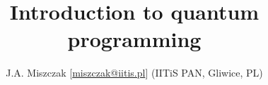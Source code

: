 \documentclass{beamer}
\title{Introduction to quantum programming}
\author{J.A. Miszczak [\url{miszczak@iitis.pl}] (IITiS PAN, Gliwice, PL)}
\begin{document}
    
    
    
\begin{frame}{}
    
\end{frame}

\begin{frame}{}
	
\end{frame}
\end{document}
